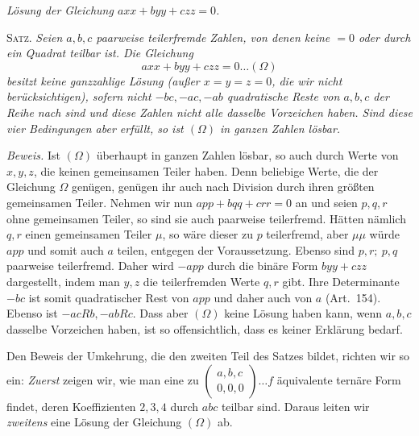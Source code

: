 \begin{center}\textit{Lösung der Gleichung \(axx+byy+czz=0\).}\end{center}
\textsc{Satz.} \textit{Seien \(a,b,c\) paarweise teilerfremde Zahlen,
von denen keine \(=0\) oder durch ein Quadrat teilbar ist. Die
Gleichung}
\[
axx+byy+czz=0\ldots(\Omega)
\]
\textit{besitzt keine ganzzahlige Lösung (außer \(x=y=z=0\), die wir
nicht berücksichtigen), sofern nicht \(-bc,-ac,-ab\) quadratische Reste
von \(a,b,c\) der Reihe nach sind und diese Zahlen nicht alle dasselbe Vorzeichen
haben. Sind diese vier Bedingungen aber erfüllt, so ist \((\Omega)\)
in ganzen Zahlen lösbar.}

\textit{Beweis.} Ist \((\Omega)\) überhaupt in ganzen Zahlen lösbar,
so auch durch Werte von \(x,y,z\), die keinen gemeinsamen Teiler
haben. Denn beliebige Werte, die der Gleichung \(\Omega\) genügen,
genügen ihr auch nach Division durch ihren größten gemeinsamen
Teiler. Nehmen wir nun \(app+bqq+crr=0\) an und seien \(p,q,r\) ohne gemeinsamen
Teiler, so sind sie auch paarweise teilerfremd. Hätten nämlich
\(q,r\) einen gemeinsamen Teiler \(\mu\), so wäre dieser zu \(p\)
teilerfremd, aber \(\mu\mu\) würde \(app\) und somit auch \(a\)
teilen, entgegen der Voraussetzung. Ebenso sind \(p,r;\ p,q\) paarweise
teilerfremd. Daher wird \(-app\) durch die binäre Form \(byy+czz\)
dargestellt, indem man \(y,z\) die teilerfremden Werte \(q,r\)
gibt. Ihre Determinante \(-bc\) ist somit quadratischer Rest
von \(app\) und daher auch von \(a\) (Art.\ 154). Ebenso ist
\(-acRb,-abRc\). Dass aber \((\Omega)\) keine Lösung haben kann, wenn \(a,b,c\)
dasselbe Vorzeichen haben, ist so offensichtlich, dass es keiner
Erklärung bedarf.

Den Beweis der Umkehrung, die den zweiten Teil des Satzes bildet,
richten wir so ein: \textit{Zuerst} zeigen wir, wie man eine zu
\(\left(\begin{smallmatrix}a,b,c\\0,0,0\end{smallmatrix}\right)\ldots f\) äquivalente ternäre Form findet, deren Koeffizienten
\(2,3,4\) durch \(abc\) teilbar sind. Daraus leiten wir \textit{zweitens}
eine Lösung der Gleichung \((\Omega)\) ab.

